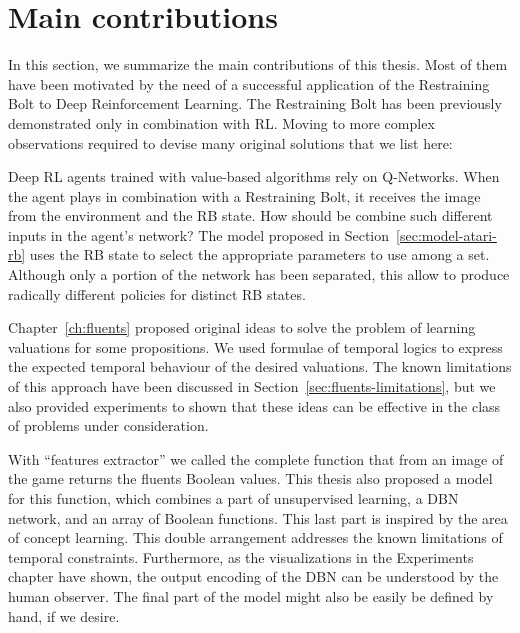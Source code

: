 \section{Main contributions}

In this section, we summarize the main contributions of this thesis. Most of
them have been motivated by the need of a successful application of the
Restraining Bolt to Deep Reinforcement Learning. The Restraining Bolt has been
previously demonstrated only in combination with RL. Moving to more complex
observations required to devise many original solutions that we list here:

\begin{description}[style=nextline]
	
	\item[Model for a deep restrained agent]
		Deep RL agents trained with value-based algorithms rely on Q-Networks.
		When the agent plays in combination with a Restraining Bolt, it receives
		the image from the environment and the RB state. How should be combine
		such different inputs in the agent's network? The model proposed in
		Section~\ref{sec:model-atari-rb} uses the RB state to select the
		appropriate parameters to use among a set. Although only a portion of the
		network has been separated, this allow to produce radically different
		policies for distinct RB states.

	\item[Learning fluents with temporal constraints]
		Chapter~\ref{ch:fluents} proposed original ideas to solve the problem of
		learning valuations for some propositions. We used formulae of temporal
		logics to express the expected temporal behaviour of the desired
		valuations. The known limitations of this approach have been discussed in
		Section~\ref{sec:fluents-limitations}, but we also provided experiments to
		shown that these ideas can be effective in the class of problems under
		consideration.

	\item[Models for the features extractor]
		With ``features extractor'' we called the complete function that from an
		image of the game returns the fluents Boolean values. This thesis also
		proposed a model for this function, which combines a part of unsupervised
		learning, a DBN network, and an array of Boolean functions. This last part
		is inspired by the area of concept learning. This double arrangement
		addresses the known limitations of temporal constraints.  Furthermore, as
		the visualizations in the Experiments chapter have shown, the output
		encoding of the DBN can be understood by the human observer.  The final
		part of the model might also be easily be defined by hand, if we desire.


\end{description}
